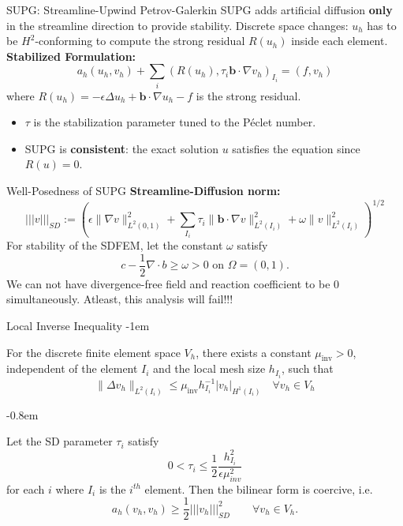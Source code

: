 \documentclass{beamer}
\newcommand{\eps}{\epsilon}
\begin{document}
\begin{frame}{SUPG: Streamline-Upwind Petrov-Galerkin}
    SUPG adds artificial diffusion \textbf{only} in the streamline direction to provide stability.
    \vfill
    \pause
    Discrete space changes: $u_h$ has to be $H^2$-conforming to compute the strong residual $R(u_h)$ inside each element.
    \vfill
    \pause
    \textbf{Stabilized Formulation:}
    \begin{equation}
        a_h(u_h,v_h) + \sum_{i} (R(u_h), \tau_i \textbf{b} \cdot \nabla v_h)_{I_i} = (f, v_h)
    \end{equation}
    where $R(u_h) = -\epsilon \Delta u_h + \textbf{b} \cdot \nabla u_h - f$ is the strong residual.
    \begin{itemize}
        \item $\tau$ is the stabilization parameter tuned to the P\'eclet number.
        \item SUPG is \textbf{consistent}: the exact solution $u$ satisfies the equation since $R(u)=0$.
    \end{itemize}
\end{frame}

\begin{frame}{Well-Posedness of SUPG}
\textbf{Streamline-Diffusion norm:}
\begin{equation}
    \boxed{|||v|||_{SD} := \left(\eps \| \nabla v\|^2_{L^2(0,1)} + \sum_{I_i} \tau_{i} \|\textbf{b} \cdot \nabla v\|^2_{L^2(I_i)} + \omega \|v\|^2_{L^2(I_i)}\right)^{1/2}}
\end{equation}
\vfill
\pause
For stability of the SDFEM, let the constant $\omega$ satisfy 
$$ c-\frac{1}{2} \nabla \cdot b \geq \omega > 0 \text{  on  } \Omega = (0,1).$$
\pause
We can not have divergence-free field and reaction coefficient to be 0 simultaneously. Atleast, this analysis will fail!!!
\end{frame}

\begin{frame}{Local Inverse Inequality}
\kern-1em
\begin{lemma}
    For the discrete finite element space $V_h$, there exists a constant $\mu_{\text{inv}} > 0$, independent of the element $I_i$ and the local mesh size $h_{I_i}$, such that
    \begin{equation*}
        \|\Delta v_h\|_{L^2(I_i)} \leq \mu_{\text{inv}} h_{I_i}^{-1} |v_h|_{H^1(I_i)} \quad \forall v_h \in V_h
    \end{equation*}
\end{lemma}
\pause
\kern-0.8em
\begin{lemma}\label{lem:sdparam}
    Let the SD parameter $\tau_i$ satisfy
    $$ 0 < \tau_i \leq \frac{1}{2} \frac{h_{I_i}^2}{\eps\mu_{inv}^2}$$
    for each $i$ where $I_i$ is the $i^{th}$ element. Then the bilinear form is coercive, i.e.
    $$a_h(v_h, v_h) \geq \frac{1}{2} ||| v_h|||^2_{SD} \qquad \forall v_h \in V_h.$$
\end{lemma}

\end{frame}
\end{document}
